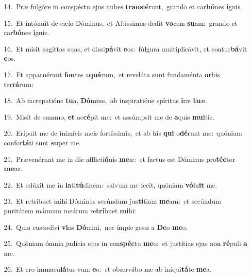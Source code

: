{\numbfont\textcolor{\numbcolor}{14.}}~Præ fulgóre in conspéctu ejus nubes \textbf{trans}\-i\-\textbf{é}\-runt,~\star grando et car\-\textbf{bó}\-nes \textbf{i}\-gnis.\par
{\numbfont\textcolor{\numbcolor}{15.}}~Et intónuit de cælo Dóminus,~\dagger et Altíssimus dedit \textbf{vo}\-cem \textbf{su}\-am:~\star grando et car\-\textbf{bó}\-nes \textbf{i}\-gnis.\par
{\numbfont\textcolor{\numbcolor}{16.}}~Et misit sagíttas suas, et dissi\-\textbf{pá}\-vit \textbf{e}\-os:~\star fúlgura multiplicávit, et contur\-\textbf{bá}\-vit \textbf{e}\-os.\par
{\numbfont\textcolor{\numbcolor}{17.}}~Et apparuérunt \textbf{fon}\-tes a\-\textbf{quá}\-rum,~\star et reveláta sunt fundaménta \textbf{or}\-bis ter\-\textbf{rá}\-rum:\par
{\numbfont\textcolor{\numbcolor}{18.}}~Ab increpatióne \textbf{tu}\-a, \textbf{Dó}\-mine,~\star ab inspiratióne spíritus \textbf{i}\-ræ \textbf{tu}\-æ.\par
{\numbfont\textcolor{\numbcolor}{19.}}~Misit de summo, \textbf{et} ac\-\textbf{cé}\-pit me:~\star et assúmpsit me de \textbf{a}\-quis \textbf{mul}\-tis.\par
{\numbfont\textcolor{\numbcolor}{20.}}~Erípuit me de inimícis meis fortíssimis,~\dagger et ab his \textbf{qui} o\-\textbf{dé}\-runt me:~\star quóniam confor\-\textbf{tá}\-ti sunt \textbf{su}\-per me.\par
{\numbfont\textcolor{\numbcolor}{21.}}~Prævenérunt me in die afflicti\-\textbf{ó}\-nis \textbf{me}\-æ:~\star et factus est Dóminus pro\-\textbf{téc}\-tor \textbf{me}\-us.\par
{\numbfont\textcolor{\numbcolor}{22.}}~Et edúxit me in \textbf{la}\-ti\-\textbf{tú}\-dinem:~\star salvum me fecit, quóniam \textbf{vó}\-lu\textbf{it} me.\par
{\numbfont\textcolor{\numbcolor}{23.}}~Et retríbuet mihi Dóminus secúndum jus\-\textbf{tí}\-tiam \textbf{me}\-am:~\star et secúndum puritátem mánuum meárum re\-\textbf{trí}\-buet \textbf{mi}\-hi:\par
{\numbfont\textcolor{\numbcolor}{24.}}~Quia custodívi \textbf{vi}\-as \textbf{Dó}\-mini,~\star nec ímpie gessi a \textbf{De}\-o \textbf{me}\-o.\par
{\numbfont\textcolor{\numbcolor}{25.}}~Quóniam ómnia judícia ejus in con\-\textbf{spéc}\-tu \textbf{me}\-o:~\star et justítias ejus non \textbf{ré}\-puli \textbf{a} me.\par
{\numbfont\textcolor{\numbcolor}{26.}}~Et ero immacu\-\textbf{lá}\-tus cum \textbf{e}\-o:~\star et observábo me ab iniqui\-\textbf{tá}\-te \textbf{me}\-a.\par
